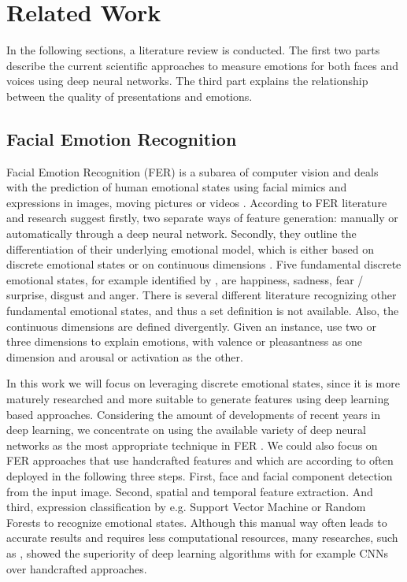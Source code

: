 \section{Related Work}
\label{sec:related_work}
In the following sections, a literature review is conducted. The first two parts describe the current scientific approaches to measure emotions for both faces and voices using deep neural networks. The third part explains the relationship between the quality of presentations and emotions.

\subsection{Facial Emotion Recognition}
\label{subsec:related_work_facial_emotion_recognition}
Facial Emotion Recognition (FER) is a subarea of computer vision and deals with the prediction of human emotional states using facial mimics and expressions in images, moving pictures or videos \cite{jain_extended_2019}.
According to  FER literature and research suggest firstly, two separate ways of feature generation: manually or automatically through a deep neural network. Secondly, they outline the differentiation of their underlying emotional model, which is either based on discrete emotional states or on continuous dimensions \cite{rosler_reducing_2021}. Five fundamental discrete emotional states, for example identified by , are happiness, sadness, fear / surprise, disgust and anger. There is several different literature recognizing other fundamental emotional states, and thus a set definition is not available. Also, the continuous dimensions are defined divergently. Given an instance,  use two or three dimensions to explain emotions, with valence or pleasantness as one dimension and arousal or activation as the other.

In this work we will focus on leveraging discrete emotional states, since it is more maturely researched and more suitable to generate features using deep learning based approaches. Considering the amount of developments of recent years in deep learning, we concentrate on using the available variety of deep neural networks as the most appropriate technique in FER \cite{jain_extended_2019}. We could also focus on FER approaches that use handcrafted features and which are according to  often deployed in the following three steps. First, face and facial component detection from the input image. Second, spatial and temporal feature extraction. And third, expression classification by e.g. Support Vector Machine or Random Forests to recognize emotional states. Although this manual way often leads to accurate results and requires less computational resources, many researches, such as , showed the superiority of deep learning algorithms with for example CNNs over handcrafted approaches.


